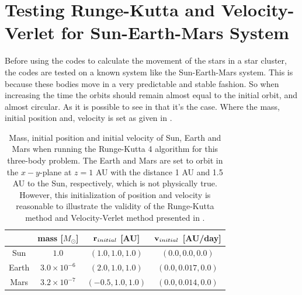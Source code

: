 \section{Testing Runge-Kutta and Velocity-Verlet for Sun-Earth-Mars System}
\label{sec:SunEarthMarsTest}

Before using the codes to calculate the movement of the stars in a star cluster, the codes are tested on a known system like the Sun-Earth-Mars system. This is because these bodies move in a very predictable and stable fashion. So when increasing the time the orbits should remain almost equal to the initial orbit, and almost circular. As it is  possible to see in  that it's the case. Where the mass, initial position and, velocity is set as given in . 

\begin{table}[H]
\centering
\caption{Mass, initial position and initial velocity of Sun, Earth and Mars when running the Runge-Kutta 4 algorithm for this three-body problem.
The Earth and Mars are set to orbit in the $x-y$-plane at $z=1$ AU with the distance 1 AU and 1.5 AU to the Sun, respectively, which is not physically true. However, this initialization of position and velocity is reasonable to illustrate the validity of the Runge-Kutta method and Velocity-Verlet method presented in .
}
\begin{center}
\begin{tabular}{ | c | c | c | c |  }
  \hline			
   & mass [$M_{\odot}$] &  $\mbox{\textbf{r}}_{initial}$ [AU] & $\mbox{\textbf{v}}_{initial}$ [AU/day]  
  \\ \hline
  Sun & $1.0$ & $(1.0,1.0,1.0)$  & $(0.0,0.0,0.0)$ 
  \\ \hline
  Earth & $3.0\times 10^{-6}$ & $(2.0,1.0,1.0)$ & $(0.0,0.017,0.0)$
  \\ \hline
  Mars & $3.2\times 10^{-7}$ & $(-0.5,1.0,1.0)$  & $(0.0,0.014,0.0)$
  \\ \hline
\end{tabular}
\end{center}
\label{tab:SunEarthMarsTest}
\end{table}


